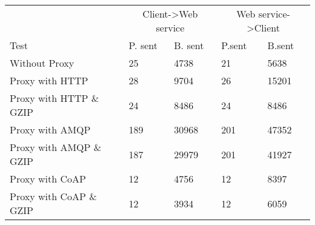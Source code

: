 \begin{tabularx}{\textwidth}{lXXXX}
\hline
\multicolumn{1}{l}{}                  & \multicolumn{2}{c}{Client->Web service}                           & \multicolumn{2}{c}{Web service->Client}                           \\
\multicolumn{1}{l}{Test} & \multicolumn{1}{l}{P. sent} & \multicolumn{1}{l}{B. sent} & \multicolumn{1}{l}{P.sent} & \multicolumn{1}{l}{B.sent} \\ \hline
Without Proxy                   & 25             & 4738           & 21             & 5638           \\
Proxy with HTTP                 & 28             & 9704           & 26             & 15201          \\
Proxy with HTTP \& GZIP         & 24             & 8486           & 24             & 8486           \\
Proxy with AMQP                 & 189            & 30968          & 201            & 47352          \\
Proxy with AMQP \& GZIP         & 187            & 29979          & 201            & 41927          \\
Proxy with CoAP                 & 12             & 4756           & 12             & 8397           \\
Proxy with CoAP \& GZIP         & 12             & 3934           & 12             & 6059           \\
\end{tabularx}

